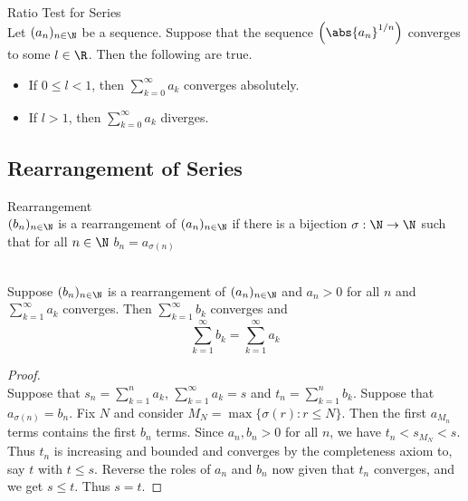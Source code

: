 \documentclass[a4paper]{article}
\begin{document}
\begin{thm}{Ratio Test for Series}{}\\
Let $(a_n)_{n\in\N}$ be a sequence. Suppose that the sequence $\left(\abs{a_n}^{1/n}\right)$ converges to some $l\in\R$. Then the following are true. 
\begin{itemize}
\item If $0\leq l<1$, then $\sum_{k=0}^\infty a_k$ converges absolutely. 
\item If $l>1$, then $\sum_{k=0}^\infty a_k$ diverges. 
\end{itemize}
\end{thm}

\subsection{Rearrangement of Series}
\begin{defn}{Rearrangement}{}\\ $(b_n)_{n\in\N}$ is a rearrangement of $(a_n)_{n\in\N}$ if there is a bijection $\sigma:\N\to\N$ such that for all $n\in\N$ $b_n=a_{\sigma(n)}$
\end{defn}

\begin{prp}{}{}\\ Suppose $(b_n)_{n\in\N}$ is a rearrangement of $(a_n)_{n\in\N}$ and $a_n>0$ for all $n$ and $\sum_{k=1}^{\infty}a_k$ converges. Then $\sum_{k=1}^{\infty}b_k$ converges and $$\sum_{k=1}^{\infty}b_k=\sum_{k=1}^{\infty}a_k$$ 
\begin{proof}\\ Suppose that $s_n=\sum_{k=1}^{n}a_k$, $\sum_{k=1}^{\infty}a_k=s$ and $t_n=\sum_{k=1}^{n}b_k$. Suppose that $a_{\sigma(n)}=b_n$. Fix $N$ and consider $M_N=\max\{\sigma(r):r\leq N\}$. Then the first $a_{M_n}$ terms contains the first $b_n$ terms. Since $a_n,b_n>0$ for all $n$, we have $t_n<s_{M_N}<s$. Thus $t_n$ is increasing and bounded and converges by the completeness axiom to, say $t$ with $t\leq s$. Reverse the roles of $a_n$ and $b_n$ now given that $t_n$ converges, and we get $s\leq t$. Thus $s=t$. 
\end{proof}
\end{prp}
\end{document}
